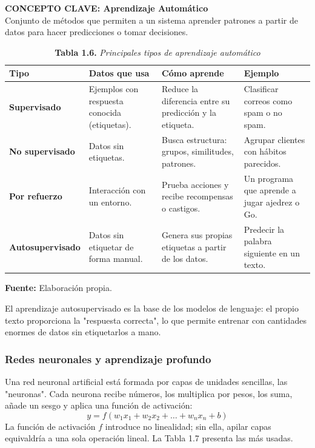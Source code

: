 \begin{cajagris}
\textbf{CONCEPTO CLAVE: Aprendizaje Automático}\\
Conjunto de métodos que permiten a un sistema aprender patrones a partir de datos para hacer predicciones o tomar decisiones.
\end{cajagris}

\begin{table}[htpb!]
\centering
\small\sffamily
\caption{\textbf{Tabla 1.6.} \textit{Principales tipos de aprendizaje automático}}
\vspace{0.15cm}
\begin{tabularx}{\textwidth}{>{\bfseries}p{3.0cm} >{\raggedright\arraybackslash}p{3.8cm} >{\raggedright\arraybackslash}p{4.2cm} >{\raggedright\arraybackslash}X}
\toprule
Tipo & Datos que usa & Cómo aprende & Ejemplo \\
\midrule
Supervisado & Ejemplos con respuesta conocida (etiquetas). & Reduce la diferencia entre su predicción y la etiqueta. & Clasificar correos como spam o no spam. \\
\midrule
No supervisado & Datos sin etiquetas. & Busca estructura: grupos, similitudes, patrones. & Agrupar clientes con hábitos parecidos. \\
\midrule
Por refuerzo & Interacción con un entorno. & Prueba acciones y recibe recompensas o castigos. & Un programa que aprende a jugar ajedrez o Go. \\
\midrule
Autosupervisado & Datos sin etiquetar de forma manual. & Genera sus propias etiquetas a partir de los datos. & Predecir la palabra siguiente en un texto. \\
\bottomrule
\end{tabularx}
\vspace{0.15cm}
\raggedright\scriptsize \textbf{Fuente:} Elaboración propia.
\end{table}

El aprendizaje autosupervisado es la base de los modelos de lenguaje: el propio texto proporciona la "respuesta correcta", lo que permite entrenar con cantidades enormes de datos sin etiquetarlos a mano.

\subsubsection{Redes neuronales y aprendizaje profundo}
Una red neuronal artificial está formada por capas de unidades sencillas, las "neuronas". Cada neurona recibe números, los multiplica por pesos, los suma, añade un sesgo y aplica una función de activación:
\begin{equation}
y = f\left( w_1 x_1 + w_2 x_2 + \dots + w_n x_n + b \right)
\end{equation}
La función de activación $f$ introduce no linealidad; sin ella, apilar capas equivaldría a una sola operación lineal. La Tabla 1.7 presenta las más usadas.

